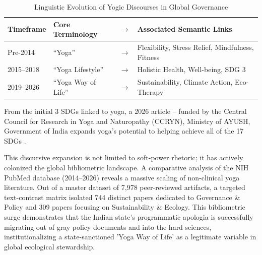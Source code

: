 \documentclass[11pt]{article}
\begin{document}
\begin{table}[htbp]
\centering
\caption{Linguistic Evolution of Yogic Discourses in Global Governance}
\label{tab:yoga_discourse_evolution}
\begin{tabular}{llcl}
\hline
\textbf{Timeframe} & \textbf{Core Terminology} & $\rightarrow$ & \textbf{Associated Semantic Links} \\ \hline
Pre-2014 & ``Yoga'' & $\rightarrow$ & Flexibility, Stress Relief, Mindfulness, Fitness \\ 
2015--2018 & ``Yoga Lifestyle'' & $\rightarrow$ & Holistic Health, Well-being, SDG 3 \\ 
2019--2026 & ``Yoga Way of Life'' & $\rightarrow$ & Sustainability, Climate Action, Eco-Therapy \\ \hline
\end{tabular}
\end{table}


From the initial 3 SDGs linked to yoga, a 2026 article – funded by the Central Council for Research in Yoga and Naturopathy (CCRYN), Ministry of AYUSH, Government of India expands yoga's potential to helping achieve all of the 17 SDGs \cite{jagannathan2026}.

This discursive expansion is not limited to soft-power rhetoric; it has actively colonized the global bibliometric landscape. A comparative analysis of the NIH PubMed database (2014–2026) reveals a massive scaling of non-clinical yoga literature. Out of a master dataset of 7,978 peer-reviewed artifacts, a targeted text-contrast matrix isolated 744 distinct papers dedicated to Governance \& Policy and 309 papers focusing on Sustainability \& Ecology. This bibliometric surge demonstrates that the Indian state's programmatic apologia is successfully migrating out of gray policy documents and into the hard sciences, institutionalizing a state-sanctioned 'Yoga Way of Life' as a legitimate variable in global ecological stewardship.
\end{document}
